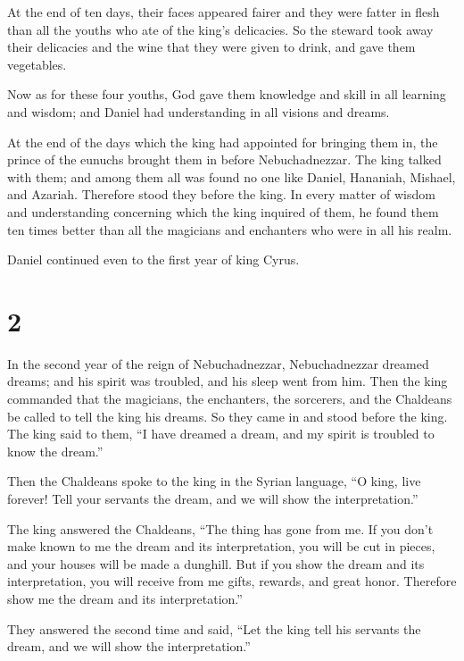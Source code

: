  At the end of ten days, their faces appeared fairer and
they were fatter in flesh than all the youths who ate of the king's
delicacies.  So the steward took away their delicacies and
the wine that they were given to drink, and gave them vegetables.

 Now as for these four youths, God gave them knowledge and
skill in all learning and wisdom; and Daniel had understanding in all
visions and dreams.

 At the end of the days which the king had appointed for
bringing them in, the prince of the eunuchs brought them in before
Nebuchadnezzar.  The king talked with them; and among them
all was found no one like Daniel, Hananiah, Mishael, and Azariah.
Therefore stood they before the king.  In every matter of
wisdom and understanding concerning which the king inquired of them, he
found them ten times better than all the magicians and enchanters who
were in all his realm.

 Daniel continued even to the first year of king Cyrus.

\hypertarget{section-1}{%
\section{2}\label{section-1}}

 In the second year of the reign of Nebuchadnezzar,
Nebuchadnezzar dreamed dreams; and his spirit was troubled, and his
sleep went from him.  Then the king commanded that the
magicians, the enchanters, the sorcerers, and the Chaldeans be called to
tell the king his dreams. So they came in and stood before the king.
 The king said to them, ``I have dreamed a dream, and my
spirit is troubled to know the dream.''

 Then the Chaldeans spoke to the king in the Syrian
language, ``O king, live forever! Tell your servants the dream, and we
will show the interpretation.''

 The king answered the Chaldeans, ``The thing has gone from
me. If you don't make known to me the dream and its interpretation, you
will be cut in pieces, and your houses will be made a dunghill.
 But if you show the dream and its interpretation, you will
receive from me gifts, rewards, and great honor. Therefore show me the
dream and its interpretation.''

 They answered the second time and said, ``Let the king tell
his servants the dream, and we will show the interpretation.''

